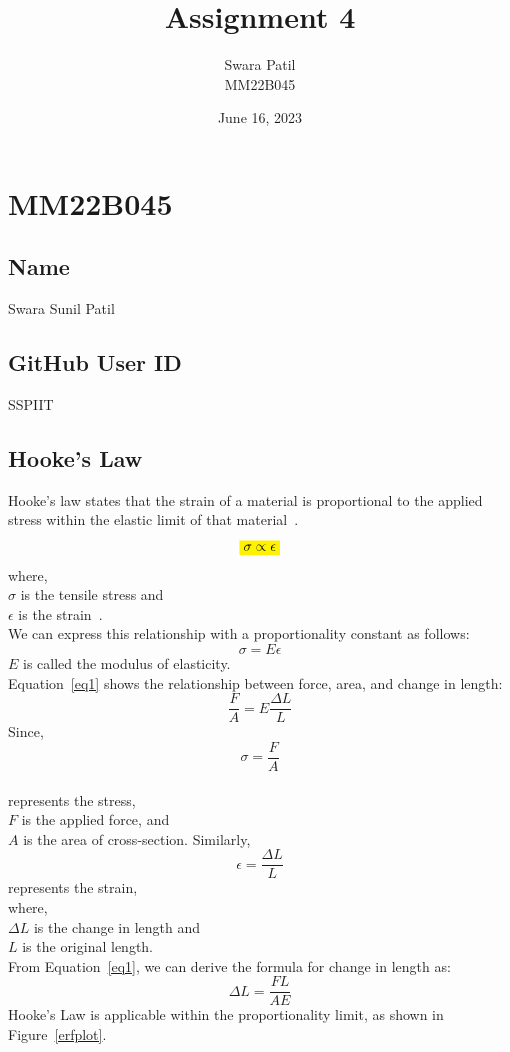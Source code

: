 \documentclass[12pt,a4paper]{article}
\author{Swara Patil \\ MM22B045}
\title{Assignment 4}
\date{June 16, 2023}
\begin{document}
\maketitle

\section{MM22B045}
\subsection{Name}
Swara Sunil Patil
\subsection{GitHub User ID}
SSPIIT
\subsection{Hooke's Law}
Hooke’s law states that the strain of a material is proportional to the applied stress within the elastic limit of that material~\cite{byjus}.
$$\colorbox{yellow}{$\sigma \propto \epsilon$}$$
where,\\
$\sigma$ is the tensile stress and \\
$\epsilon$ is the strain~\cite{wiki}.\\ 
We can express this relationship with a proportionality constant as follows:
$$\sigma = E\epsilon$$
$E$ is called the modulus of elasticity.\\ Equation~\ref{eq1} shows the relationship between force, area, and change in length:
\begin{equation}
    \frac{F}{A} = E\frac{\Delta L}{L}
    \label{eq1}
\end{equation}
Since, $$\sigma = \frac{F}{A}$$\\
represents the stress,\\ $F$ is the applied force, and \\$A$ is the area of cross-section. Similarly, $$\epsilon = \frac{\Delta L}{L}$$
represents the strain, \\where,\\
$\Delta L$ is the change in length and \\
$L$ is the original length.\\
From Equation~\ref{eq1}, we can derive the formula for change in length as:
$$\Delta L = \frac{F L}{A E}$$
Hooke's Law is applicable within the proportionality limit, as shown in Figure~\ref{erfplot}.
\end{document}
